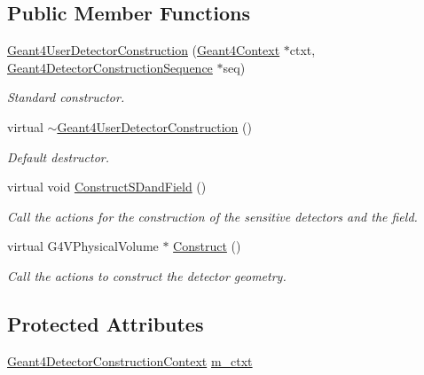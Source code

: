 \subsection*{Public Member Functions}
\begin{DoxyCompactItemize}
\item 
\hyperlink{class_d_d4hep_1_1_simulation_1_1_geant4_user_detector_construction_af1e3e857893be886738096501d5932f7}{Geant4\+User\+Detector\+Construction} (\hyperlink{class_d_d4hep_1_1_simulation_1_1_geant4_context}{Geant4\+Context} $\ast$ctxt, \hyperlink{class_d_d4hep_1_1_simulation_1_1_geant4_detector_construction_sequence}{Geant4\+Detector\+Construction\+Sequence} $\ast$seq)
\begin{DoxyCompactList}\small\item\em Standard constructor. \end{DoxyCompactList}\item 
virtual \hyperlink{class_d_d4hep_1_1_simulation_1_1_geant4_user_detector_construction_a076334cddb22f1ca55027d6bc3a1aac9}{$\sim$\+Geant4\+User\+Detector\+Construction} ()
\begin{DoxyCompactList}\small\item\em Default destructor. \end{DoxyCompactList}\item 
virtual void \hyperlink{class_d_d4hep_1_1_simulation_1_1_geant4_user_detector_construction_ab384a947bde0262d2c86f3f83099e4c4}{Construct\+S\+Dand\+Field} ()
\begin{DoxyCompactList}\small\item\em Call the actions for the construction of the sensitive detectors and the field. \end{DoxyCompactList}\item 
virtual G4\+V\+Physical\+Volume $\ast$ \hyperlink{class_d_d4hep_1_1_simulation_1_1_geant4_user_detector_construction_a93280a762663896986d38ece7afd1abc}{Construct} ()
\begin{DoxyCompactList}\small\item\em Call the actions to construct the detector geometry. \end{DoxyCompactList}\end{DoxyCompactItemize}
\subsection*{Protected Attributes}
\begin{DoxyCompactItemize}
\item 
\hyperlink{class_d_d4hep_1_1_simulation_1_1_geant4_detector_construction_context}{Geant4\+Detector\+Construction\+Context} \hyperlink{class_d_d4hep_1_1_simulation_1_1_geant4_user_detector_construction_ab099fe83f02b9f8ffdda9f0f21a01202}{m\+\_\+ctxt}
\end{DoxyCompactItemize}
